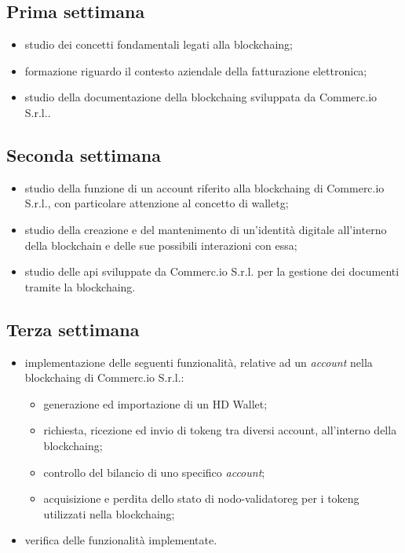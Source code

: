 \subsection{Prima settimana}
\begin{itemize}
	\item studio dei concetti fondamentali legati alla \gls{blockchaing};
	\item formazione riguardo il contesto aziendale della fatturazione elettronica;
	\item studio della documentazione della \gls{blockchaing} sviluppata da Commerc.io S.r.l..
\end{itemize}

\subsection{Seconda settimana} 
\begin{itemize}
	\item studio della funzione di un account riferito alla \gls{blockchaing} di Commerc.io S.r.l., con particolare attenzione al concetto di \gls{walletg}\glsfirstoccur;
	\item studio della creazione e del mantenimento di un'identità digitale all'interno della blockchain e delle sue possibili interazioni con essa;
	\item studio delle \gls{api} sviluppate da Commerc.io S.r.l. per la gestione dei documenti tramite la \gls{blockchaing}.
\end{itemize}

\subsection{Terza settimana}
\begin{itemize}
	\item implementazione delle seguenti funzionalità, relative ad un \textit{account} nella \gls{blockchaing} di Commerc.io S.r.l.:
	\begin{itemize}
		\item generazione ed importazione di un HD Wallet;
		\item richiesta, ricezione ed invio di \gls{tokeng}\glsfirstoccur{} tra diversi account, all'interno della \gls{blockchaing};
		\item controllo del bilancio di uno specifico \textit{account};
		\item acquisizione e perdita dello stato di \gls{nodo-validatoreg}\glsfirstoccur{} per i \gls{tokeng} utilizzati nella \gls{blockchaing};
	\end{itemize}
	\item verifica delle funzionalità implementate.
\end{itemize}

